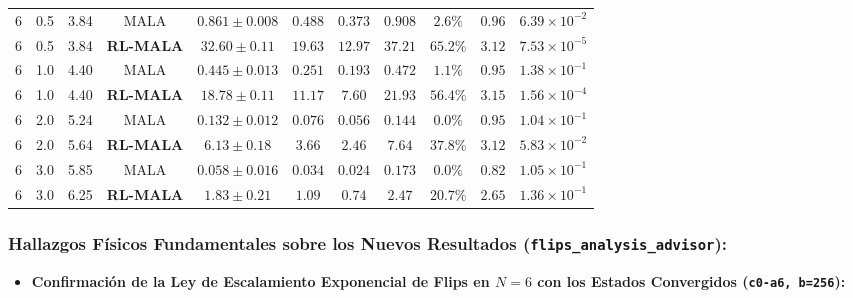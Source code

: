 \documentclass[10pt,a4paper]{article}
\begin{document}
\begin{table}[H]
\begin{adjustbox}{max width=\textwidth}
\begin{tabular}{lcccccccccc}
6 & 0.5 & 3.84 & MALA & $0.861 \pm 0.008$ & $0.488$ & $0.373$ & $0.908$ & $2.6\%$ & $0.96$ & $6.39 \times 10^{-2}$ \\
6 & 0.5 & 3.84 & \textbf{RL-MALA} & \textbf{$32.60 \pm 0.11$} & \textbf{$19.63$} & \textbf{$12.97$} & \textbf{$37.21$} & \textbf{$65.2\%$} & \textbf{$3.12$} & \textbf{$7.53 \times 10^{-5}$} \\
6 & 1.0 & 4.40 & MALA & $0.445 \pm 0.013$ & $0.251$ & $0.193$ & $0.472$ & $1.1\%$ & $0.95$ & $1.38 \times 10^{-1}$ \\
6 & 1.0 & 4.40 & \textbf{RL-MALA} & \textbf{$18.78 \pm 0.11$} & \textbf{$11.17$} & \textbf{$7.60$} & \textbf{$21.93$} & \textbf{$56.4\%$} & \textbf{$3.15$} & \textbf{$1.56 \times 10^{-4}$} \\
6 & 2.0 & 5.24 & MALA & $0.132 \pm 0.012$ & $0.076$ & $0.056$ & $0.144$ & $0.0\%$ & $0.95$ & $1.04 \times 10^{-1}$ \\
6 & 2.0 & 5.64 & \textbf{RL-MALA} & \textbf{$6.13 \pm 0.18$} & \textbf{$3.66$} & \textbf{$2.46$} & \textbf{$7.64$} & \textbf{$37.8\%$} & \textbf{$3.12$} & \textbf{$5.83 \times 10^{-2}$} \\
6 & 3.0 & 5.85 & MALA & $0.058 \pm 0.016$ & $0.034$ & $0.024$ & $0.173$ & $0.0\%$ & $0.82$ & $1.05 \times 10^{-1}$ \\
6 & 3.0 & 6.25 & \textbf{RL-MALA} & \textbf{$1.83 \pm 0.21$} & \textbf{$1.09$} & \textbf{$0.74$} & \textbf{$2.47$} & \textbf{$20.7\%$} & \textbf{$2.65$} & \textbf{$1.36 \times 10^{-1}$} \\
\bottomrule
\end{tabular}
\end{adjustbox}
\end{table}



\subsubsection{Hallazgos Físicos Fundamentales sobre los Nuevos Resultados (\texttt{flips\_analysis\_advisor}):}

\begin{itemize}
\item \textbf{Confirmación de la Ley de Escalamiento Exponencial de Flips en $N=6$ con los Estados Convergidos (\texttt{c0-a6, b=256}):}
\end{itemize}
\end{document}
